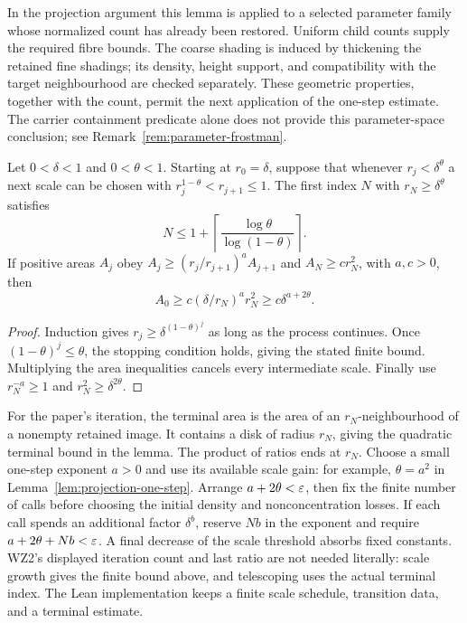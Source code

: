 In the projection argument this lemma is applied to a selected
parameter family whose normalized count has already been restored.
Uniform child counts supply the required fibre bounds. The coarse
shading is induced by thickening the retained fine shadings; its
density, height support, and compatibility with the target
neighbourhood are checked separately. These geometric properties,
together with the count, permit the next application of the one-step
estimate. The carrier containment predicate alone does not provide
this parameter-space conclusion; see
Remark~\ref{rem:parameter-frostman}.

\begin{lemma}
\label{lem:projection-iteration}
Let $0<\delta<1$ and $0<\theta<1$. Starting at $r_0=\delta$,
suppose that whenever $r_j<\delta^\theta$ a next scale can be chosen
with $r_j^{1-\theta}<r_{j+1}\leq1$. The first index $N$ with
$r_N\geq\delta^\theta$ satisfies
\[
 N\leq1+\left\lceil\frac{\log\theta}{\log(1-\theta)}\right\rceil.
\]
If positive areas $A_j$ obey
$A_j\geq(r_j/r_{j+1})^a A_{j+1}$ and
$A_N\geq c r_N^2$, with $a,c>0$, then
\[
 A_0\geq c(\delta/r_N)^a r_N^2
                       \geq c\delta^{a+2\theta}.
\]
\end{lemma}
\begin{proof}
Induction gives $r_j\geq\delta^{(1-\theta)^j}$ as long as the
process continues. Once $(1-\theta)^j\leq\theta$, the stopping
condition holds, giving the stated finite bound. Multiplying the
area inequalities cancels every intermediate scale. Finally use
$r_N^{-a}\geq1$ and $r_N^2\geq\delta^{2\theta}$.
\end{proof}

\begin{remark}
\label{rem:projection-iteration}
For the paper's iteration, the terminal area is the area of an
$r_N$-neighbourhood of a nonempty retained image. It contains a disk
of radius $r_N$, giving the quadratic terminal bound in the lemma.
The product of ratios ends at $r_N$.
Choose a small one-step exponent $a>0$ and use its available scale
gain: for example, $\theta=a^2$ in Lemma~\ref{lem:projection-one-step}.
Arrange $a+2\theta<\varepsilon$, then fix the finite number of calls before
choosing the initial density and nonconcentration losses. If each
call spends an additional factor $\delta^b$, reserve $Nb$ in the
exponent and require $a+2\theta+Nb<\varepsilon$. A final decrease of the
scale threshold absorbs fixed constants.
WZ2's displayed iteration count and last ratio are not needed
literally: scale growth gives the finite bound above, and telescoping
uses the actual terminal index. The Lean implementation keeps a
finite scale schedule, transition data, and a terminal estimate.
\end{remark}


